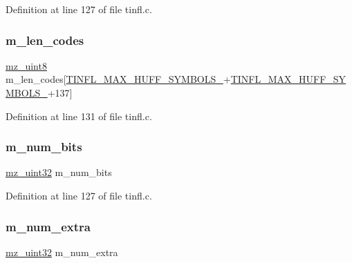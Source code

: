 Definition at line 127 of file tinfl.\+c.

\mbox{\label{structtinfl__decompressor__tag_a7b5666f8fdd4854701ca97b6cf80b830}} 
\subsubsection{\texorpdfstring{m\_len\_codes}{m\_len\_codes}}
{\footnotesize\ttfamily \mbox{\hyperlink{tinfl_8c_a9354eca32f90733aa9bb3738c92da596}{mz\+\_\+uint8}} m\+\_\+len\+\_\+codes\mbox{[}\mbox{\hyperlink{tinfl_8c_adf764cbdea00d65edcd07bb9953ad2b7abc60f0bf72551ed7cbbf1ed9b20752ba}{T\+I\+N\+F\+L\+\_\+\+M\+A\+X\+\_\+\+H\+U\+F\+F\+\_\+\+S\+Y\+M\+B\+O\+L\+S\+\_}}+\mbox{\hyperlink{tinfl_8c_adf764cbdea00d65edcd07bb9953ad2b7ac44807ea07817afa2b5e97b5bfc204fb}{T\+I\+N\+F\+L\+\_\+\+M\+A\+X\+\_\+\+H\+U\+F\+F\+\_\+\+S\+Y\+M\+B\+O\+L\+S\+\_}}+137\mbox{]}}



Definition at line 131 of file tinfl.\+c.

\mbox{\label{structtinfl__decompressor__tag_a504bc14c88dc5ad5c0425812f6e4ec4c}} 
\subsubsection{\texorpdfstring{m\_num\_bits}{m\_num\_bits}}
{\footnotesize\ttfamily \mbox{\hyperlink{tinfl_8c_ab1a91818a39ac203d5d9f12a003e8557}{mz\+\_\+uint32}} m\+\_\+num\+\_\+bits}



Definition at line 127 of file tinfl.\+c.

\mbox{\label{structtinfl__decompressor__tag_aeca30360d877f2a99f6d6f0e94460382}} 
\subsubsection{\texorpdfstring{m\_num\_extra}{m\_num\_extra}}
{\footnotesize\ttfamily \mbox{\hyperlink{tinfl_8c_ab1a91818a39ac203d5d9f12a003e8557}{mz\+\_\+uint32}} m\+\_\+num\+\_\+extra}



